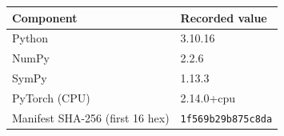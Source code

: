 \begin{tabular}{ll}
\toprule
Component & Recorded value \\
\midrule
Python & 3.10.16 \\
NumPy & 2.2.6 \\
SymPy & 1.13.3 \\
PyTorch (CPU) & 2.14.0+cpu \\
Manifest SHA-256 (first 16 hex) & \texttt{1f569b29b875c8da} \\
\bottomrule
\end{tabular}
